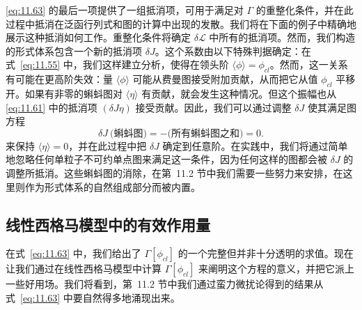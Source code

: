 \eqref{eq:11.63} 的最后一项提供了一组抵消项，可用于满足对 $\Gamma$ 的重整化条件，并在此过程中抵消在泛函行列式和图的计算中出现的发散。我们将在下面的例子中精确地展示这种抵消如何工作。重整化条件将确定 $\delta\mathcal{L}$ 中所有的抵消项。然而，我们构造的形式体系包含一个新的抵消项 $\delta J$。这个系数由以下特殊判据确定：在式~\eqref{eq:11.55} 中，我们这样建立分析，使得在领头阶 $\langle\phi\rangle = \phi_{cl}$。然而，这一关系有可能在更高阶失效：量 $\langle\phi\rangle$ 可能从费曼图接受附加贡献，从而把它从值 $\phi_{cl}$ 平移开。如果有非零的蝌蚪图对 $\langle\eta\rangle$ 有贡献，就会发生这种情况。但这个振幅也从 \eqref{eq:11.61} 中的抵消项 $(\delta J\eta)$ 接受贡献。因此，我们可以通过调整 $\delta J$ 使其满足图方程
\begin{equation}
  \delta J\ \bigl( \text{蝌蚪图} \bigr)
  = -\bigl( \text{所有蝌蚪图之和} \bigr) = 0 .
  \label{eq:11.64}
\end{equation}
来保持 $\langle\eta\rangle = 0$，并在此过程中把 $\delta J$ 确定到任意阶。在实践中，我们将通过简单地忽略任何单粒子不可约单点图来满足这一条件，因为任何这样的图都会被 $\delta J$ 的调整所抵消。这些蝌蚪图的消除，在第~11.2 节中我们需要一些努力来安排，在这里则作为形式体系的自然组成部分而被内置。

\subsection{线性西格马模型中的有效作用量}

在式~\eqref{eq:11.63} 中，我们给出了 $\Gamma[\phi_{cl}]$ 的一个完整但并非十分透明的求值。现在让我们通过在线性西格马模型中计算 $\Gamma[\phi_{cl}]$ 来阐明这个方程的意义，并把它派上一些好用场。我们将看到，第~11.2 节中我们通过蛮力微扰论得到的结果从式~\eqref{eq:11.63} 中要自然得多地涌现出来。


